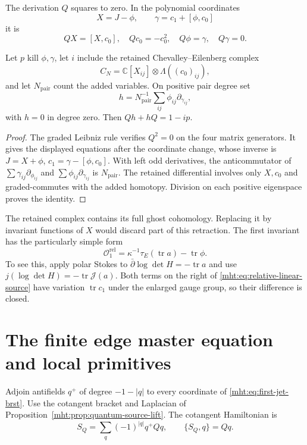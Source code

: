 \begin{theorem}\label{mht:thm:edge-brst-contraction}
The derivation $Q$ squares to zero. In the polynomial coordinates
\[
 X=J-\phi,\qquad \gamma=c_1+[\phi,c_0]
\]
it is
\[
 QX=[X,c_0],\quad Qc_0=-c_0^2,\quad Q\phi=\gamma,\quad Q\gamma=0.
\]

Let $p$ kill $\phi,\gamma$, let $i$ include the retained
Chevalley--Eilenberg complex
\[
 C_N=\mathbb C[X_{ij}]\otimes\Lambda((c_0)_{ij}),
\]
and let $N_{\mathrm{pair}}$ count the added variables. On positive
pair degree set
\[
 h=N_{\mathrm{pair}}^{-1}\sum_{ij}
                         \phi_{ij}\partial_{\gamma_{ij}},
\]
with $h=0$ in degree zero. Then $Qh+hQ=1-ip$.
\end{theorem}

\begin{proof}
The graded Leibniz rule verifies $Q^2=0$ on the four matrix
generators. It gives the displayed equations after the coordinate
change, whose inverse is $J=X+\phi$,
$c_1=\gamma-[\phi,c_0]$.
With left odd derivatives, the anticommutator of
$\sum\gamma_{ij}\partial_{\phi_{ij}}$ and
$\sum\phi_{ij}\partial_{\gamma_{ij}}$ is
$N_{\mathrm{pair}}$. The retained differential involves only
$X,c_0$ and graded-commutes with the added homotopy. Division on
each positive eigenspace proves the identity.
\end{proof}

The retained complex contains its full ghost cohomology. Replacing
it by invariant functions of $X$ would discard part of this
retraction. The first invariant has the particularly simple form
\begin{equation}\label{mht:eq:relative-linear-source}
 \mathcal O_1^{\mathrm{rel}}
       =\kappa^{-1}\tau_E(\operatorname{tr}a)-\operatorname{tr}\phi.
\end{equation}
To see this, apply polar Stokes to
$\bar\partial\log\det H=-\operatorname{tr}a$ and use
$j(\log\det H)=-\operatorname{tr}\mathcal J(a)$.
Both terms on the right of \eqref{mht:eq:relative-linear-source}
have variation $\operatorname{tr}c_1$ under the enlarged gauge
group, so their difference is closed.

\section{The finite edge master equation and local primitives}

Adjoin antifields $q^+$ of degree $-1-|q|$ to every coordinate
of \eqref{mht:eq:first-jet-brst}. Use the cotangent bracket and
Laplacian of Proposition~\ref{mht:prop:quantum-source-lift}. The
cotangent Hamiltonian is
\[
 S_Q=\sum_q(-1)^{|q|}q^+Qq,\qquad \{S_Q,q\}=Qq.
\]

